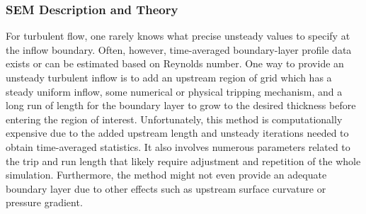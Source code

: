 \subsubsection{SEM Description and Theory}\label{SEC:SEM:theory}

For turbulent flow, one rarely knows what precise unsteady values to
specify at the inflow boundary.
%
Often, however, time-averaged boundary-layer profile data exists or can be
estimated based on Reynolds number.
%
One way to provide an unsteady turbulent inflow is to add
an upstream region of grid which has a steady uniform inflow,
some numerical or physical tripping mechanism, and
a long run of length for the boundary layer to grow to the desired
thickness before entering the region of interest.
%
Unfortunately, this method is computationally expensive due to the added
upstream length and unsteady iterations needed to obtain time-averaged
statistics.
%
It also involves numerous parameters related to the trip and run length
that likely require adjustment and repetition of the whole simulation.
%
Furthermore, the method might not even provide an adequate boundary layer
due to other effects such as upstream surface curvature or pressure gradient.


